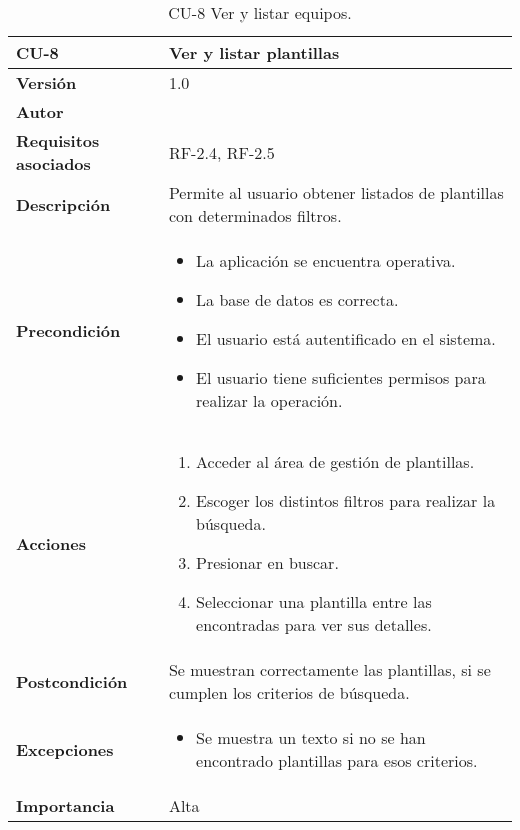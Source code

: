 \begin{table}[p]
	\centering
	\begin{tabularx}{\linewidth}{ p{} p{} }
		\toprule
		\textbf{CU-8}    & \textbf{ Ver y listar plantillas}\\
		\toprule
		\textbf{Versión}              & 1.0    \\
		\textbf{Autor}                & \@author{} \\
		\textbf{Requisitos asociados} & RF-2.4, RF-2.5\\
		\textbf{Descripción}          & Permite al usuario obtener listados de plantillas con determinados filtros. \\
		\textbf{Precondición}         &
		\begin{itemize}
			\tightlist
			\item La aplicación se encuentra operativa.
			\item La base de datos es correcta.
			\item El usuario está autentificado en el sistema.
			\item El usuario tiene suficientes permisos para realizar la operación.
		\end{itemize}\\
		\textbf{Acciones}             &
		\begin{enumerate}
			\tightlist
			\item Acceder al área de gestión de plantillas.
			\item Escoger los distintos filtros para realizar la búsqueda.
			\item Presionar en buscar.
			\item Seleccionar una plantilla entre las encontradas para ver sus detalles.
		\end{enumerate}\\
		\textbf{Postcondición}        & Se muestran correctamente las plantillas, si se cumplen los criterios de búsqueda.\\
		\textbf{Excepciones}          &
		\begin{itemize}
			\tightlist
			\item Se muestra un texto si no se han encontrado plantillas para esos criterios.
		\end{itemize}\\
		\textbf{Importancia}          & Alta\\
		\bottomrule
	\end{tabularx}
	\caption{CU-8 Ver y listar equipos.}\label{tab:table-8}
\end{table}

